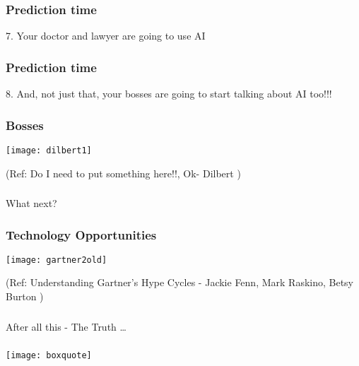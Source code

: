 \begin{frame}[fragile]\frametitle{Prediction time}
7. Your doctor and lawyer are going to use AI
\end{frame}

\begin{frame}[fragile]\frametitle{Prediction time}
8. And, not just that, your bosses are going to start talking about AI too!!!
\end{frame}

\begin{frame}[fragile]\frametitle{Bosses}
\begin{center}
\texttt{[image: dilbert1]}
\end{center}
{\tiny (Ref: Do I need to put something here!!, Ok- Dilbert )}
\end{frame}

\begin{frame}[fragile]\frametitle{}
\begin{center}
{\Large What next?}
\end{center}
\end{frame}

\begin{frame}[fragile]\frametitle{Technology Opportunities}
\begin{center}
\texttt{[image: gartner2old]}
\end{center}
{\tiny (Ref: Understanding Gartner's Hype Cycles - Jackie Fenn, Mark Raskino, Betsy Burton )}
\end{frame}


\begin{frame}[fragile]\frametitle{}
\begin{center}
{\Large After all this - The Truth \ldots}
\end{center}
\end{frame}

\begin{frame}[fragile]\frametitle{}
\begin{center}
\texttt{[image: boxquote]}
\end{center}
\end{frame}



